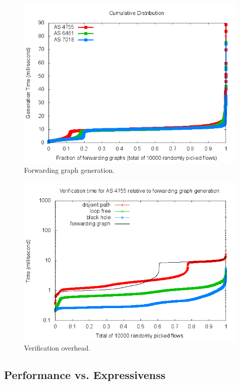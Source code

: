\begin{figure}
  \centering
  \includegraphics[width=1\linewidth]{figures/fg_cdf_10000.png}
  \caption{Forwarding graph generation.}
  \label{fig:init}
\end{figure}

\begin{figure}
  \centering
  \includegraphics[width=1\linewidth]{figures/verify_cdf10000.png}
  \caption{Verification overhead.}
  \label{fig:init}
\end{figure}


\subsection{Performance vs. Expressivenss}

